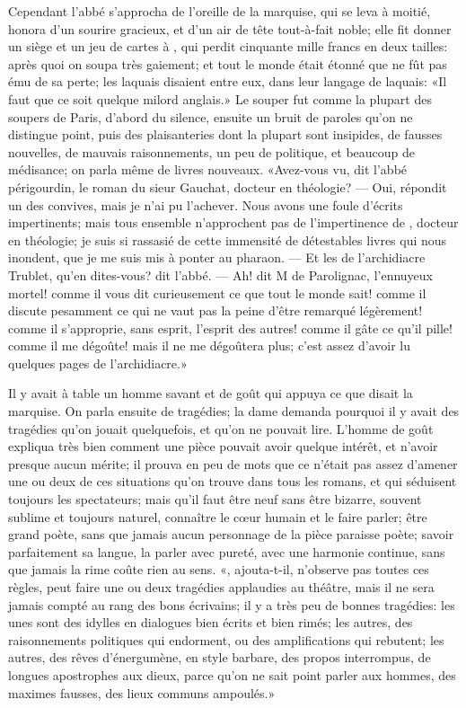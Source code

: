Cependant l’abbé s’approcha de l’oreille de la marquise, qui se leva à
moitié, honora  d’un sourire gracieux, et  d’un air de
tête tout-à-fait noble; elle fit donner un siège et un jeu de cartes à
, qui perdit cinquante mille francs en deux tailles: après quoi
on soupa très gaiement; et tout le monde était étonné que  ne
fût pas ému de sa perte; les laquais disaient entre eux, dans leur
langage de laquais: «Il faut que ce soit quelque milord anglais.» Le
souper fut comme la plupart des soupers de Paris, d’abord du silence,
ensuite un bruit de paroles qu’on ne distingue point, puis des
plaisanteries dont la plupart sont insipides, de fausses nouvelles, de
mauvais raisonnements, un peu de politique, et beaucoup de médisance;
on parla même de livres nouveaux. «Avez-vous vu, dit l’abbé périgourdin,
le roman du sieur Gauchat, docteur en théologie? — Oui, répondit un des
convives, mais je n’ai pu l’achever. Nous avons une foule d’écrits
impertinents; mais tous ensemble n’approchent pas de l’impertinence de
, docteur en théologie; je suis si rassasié de cette
immensité de détestables livres qui nous inondent, que je me suis mis à
ponter au pharaon. — Et les \emph{} de l’archidiacre Trublet, qu’en
dites-vous? dit l’abbé. — Ah! dit M de Parolignac, l’ennuyeux
mortel! comme il vous dit curieusement ce que tout le monde sait! comme
il discute pesamment ce qui ne vaut pas la peine d’être remarqué
légèrement! comme il s’approprie, sans esprit, l’esprit des autres!
comme il gâte ce qu’il pille! comme il me dégoûte! mais il ne me
dégoûtera plus; c’est assez d’avoir lu quelques pages de l’archidiacre.»


Il y avait à table un homme savant et de goût qui appuya ce que disait
la marquise. On parla ensuite de 
tragédies;
 la dame demanda pourquoi il
y avait des tragédies qu’on jouait quelquefois, et qu’on ne pouvait
lire. L’homme de goût expliqua très bien comment une pièce pouvait
avoir quelque intérêt, et n’avoir presque aucun mérite; il prouva en
peu de mots que ce n’était pas assez d’amener une ou deux de ces
situations qu’on trouve dans tous les romans, et qui séduisent toujours
les spectateurs; mais qu’il faut être neuf sans être bizarre, souvent
sublime et toujours naturel, connaître le cœur humain et le faire
parler; être grand poète, sans que jamais aucun personnage de la pièce
paraisse poète; savoir parfaitement sa langue, la parler avec pureté,
avec une harmonie continue, sans que jamais la rime coûte rien au sens.
«, ajouta-t-il, 
n’observe
 pas toutes ces règles, peut faire une
ou deux tragédies applaudies au théâtre, mais il ne sera jamais compté
au rang des bons écrivains; il y a très peu de bonnes tragédies: les
unes sont des idylles en dialogues bien écrits et bien rimés; les
autres, des raisonnements politiques qui endorment, ou des
amplifications qui rebutent; les autres, des rêves d’énergumène, en
style barbare, des propos interrompus, de longues apostrophes aux
dieux, parce qu’on ne sait point parler aux hommes, des maximes fausses,
des lieux communs ampoulés.»


